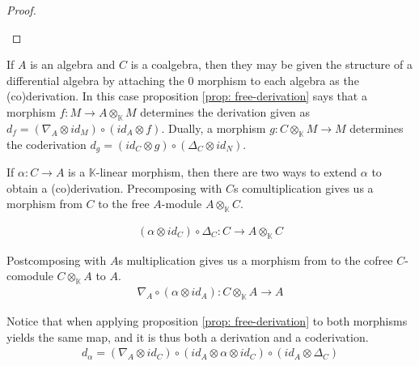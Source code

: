 \documentclass[../thesis.tex]{subfiles}
\begin{document}
\begin{proof}
\begin{center}
                \end{center}
            \end{proof}

            If $A$ is an algebra and $C$ is a coalgebra, then they may be given the structure of a differential algebra by attaching the $0$ morphism to each algebra as the (co)derivation. In this case proposition \ref{prop: free-derivation} says that a morphism $f : M \rightarrow A \otimes_\mathbb{K} M$ determines the derivation given as $d_f = (\nabla_A \otimes id_M) \circ (id_A\otimes f)$. Dually, a morphism $g : C \otimes_\mathbb{K} M \rightarrow M$ determines the coderivation $d_g = (id_C \otimes g) \circ (\Delta_C \otimes id_N)$.

            If $\alpha : C \rightarrow A$ is a $\mathbb{K}$-linear morphism, then there are two ways to extend $\alpha$ to obtain a (co)derivation. Precomposing with $C$s comultiplication gives us a morphism from $C$ to the free $A$-module $A\otimes_\mathbb{K} C$.  

            \begin{align*}
                (\alpha \otimes id_C) \circ \Delta_C : C \rightarrow A \otimes_\mathbb{K} C
            \end{align*}

            Postcomposing with $A$s multiplication gives us a morphism from to the cofree $C$-comodule $C\otimes_\mathbb{K}A$ to $A$.
            \begin{align*}
                \nabla_A \circ (\alpha \otimes id_A) : C \otimes_\mathbb{K} A \rightarrow A
            \end{align*}

            Notice that when applying proposition \ref{prop: free-derivation} to both morphisms yields the same map, and it is thus both a derivation and a coderivation.
            \begin{align*}
                d_\alpha = (\nabla_A\otimes id_C) \circ (id_A \otimes \alpha \otimes id_C) \circ (id_A \otimes \Delta_C)
            \end{align*}
\end{document}
